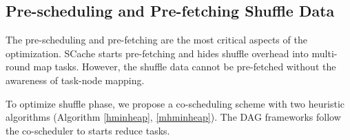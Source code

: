 {\color{black}
\subsection{Pre-scheduling and Pre-fetching Shuffle Data}
The pre-scheduling and pre-fetching are the most critical aspects of the optimization.
SCache starts pre-fetching and hides shuffle overhead into multi-round map tasks.
However, the shuffle data cannot be pre-fetched without the awareness of task-node mapping.

To optimize shuffle phase, we propose a co-scheduling scheme with two heuristic algorithms (Algorithm \ref{hminheap}, \ref{mhminheap}). 
The DAG frameworks follow the co-scheduler to starts reduce tasks.
}

